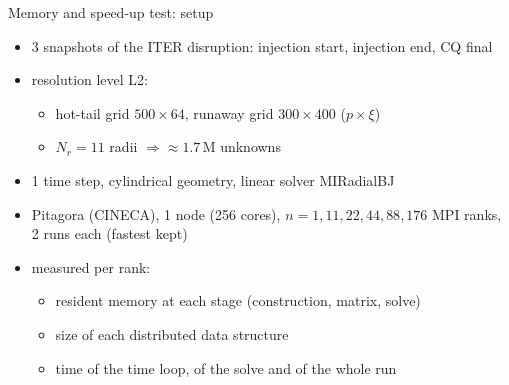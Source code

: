 \begin{frame}{Memory and speed-up test: setup}
    \begin{itemize}
        \item 3 snapshots of the ITER disruption: injection start, injection end, CQ final
        \item resolution level L2:
        \begin{itemize}
            \item hot-tail grid $500 \times 64$, runaway grid $300 \times 400$ ($p \times \xi$)
            \item $N_r = 11$ radii $\Rightarrow \approx 1.7$\,M unknowns
        \end{itemize}
        \item 1 time step, cylindrical geometry, linear solver MIRadialBJ
        \item Pitagora (CINECA), 1 node (256 cores), $n = 1, 11, 22, 44, 88, 176$ MPI ranks,
              2 runs each (fastest kept)
        \item measured per rank:
        \begin{itemize}
            \item resident memory at each stage (construction, matrix, solve)
            \item size of each distributed data structure
            \item time of the time loop, of the solve and of the whole run
        \end{itemize}
    \end{itemize}
\end{frame}


